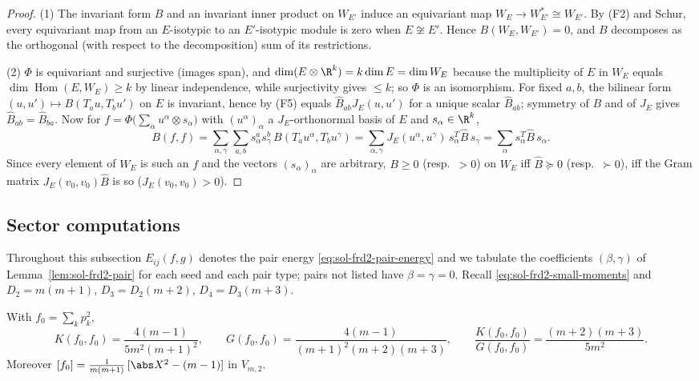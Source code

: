 \documentclass[../main.tex]{subfiles}
\begin{document}
\begin{proof}
(1)  The invariant form $B$ and an invariant inner product on $W_{E'}$ induce an
equivariant map $W_E\to W_{E'}^*\cong W_{E'}$.  By (F2) and Schur, every equivariant
map from an $E$-isotypic to an $E'$-isotypic module is zero when
$E\not\cong E'$.  Hence $B(W_E,W_{E'})=0$, and $B$ decomposes as the orthogonal
(with respect to the decomposition) sum of its restrictions.

(2)  $\Phi$ is equivariant and surjective (images span), and
$\dim(E\otimes\R^k)=k\dim E=\dim W_E$ because the multiplicity of $E$ in $W_E$
equals $\dim\operatorname{Hom}(E,W_E)\ge k$ by linear independence, while
surjectivity gives $\le k$; so $\Phi$ is an isomorphism.  For fixed $a,b$, the
bilinear form $(u,u')\mapsto B(T_au,T_bu')$ on $E$ is invariant, hence by (F5) equals
$\widehat B_{ab}J_E(u,u')$ for a unique scalar $\widehat B_{ab}$; symmetry of $B$ and
of $J_E$ gives $\widehat B_{ab}=\widehat B_{ba}$.  Now for
$f=\Phi\bigl(\sum_\alpha u^\alpha\otimes s_\alpha\bigr)$ with $(u^\alpha)_\alpha$ a
$J_E$-orthonormal basis of $E$ and $s_\alpha\in\R^k$,
\begin{equation}
  B(f,f)
  =\sum_{\alpha,\gamma}\sum_{a,b}
   s_\alpha^a s_\gamma^b\,B(T_au^\alpha,T_bu^\gamma)
  =\sum_{\alpha,\gamma}J_E(u^\alpha,u^\gamma)\,s_\alpha^T\widehat B\,s_\gamma
  =\sum_\alpha s_\alpha^T\widehat B\,s_\alpha.
  \label{eq:sol-frd2-tensor-sum}
\end{equation}
Since every element of $W_E$ is such an $f$ and the vectors
$(s_\alpha)_\alpha$ are arbitrary, $B\ge0$ (resp.\ $>0$) on $W_E$ iff
$\widehat B\succeq0$ (resp.\ $\succ0$), iff the Gram matrix
$J_E(v_0,v_0)\widehat B$ is so ($J_E(v_0,v_0)>0$).
\end{proof}

\subsection*{Sector computations}

Throughout this subsection $E_{ij}(f,g)$ denotes the pair energy
\eqref{eq:sol-frd2-pair-energy} and we tabulate the coefficients
$(\beta,\gamma)$ of Lemma~\ref{lem:sol-frd2-pair} for each seed and each pair type;
pairs not listed have $\beta=\gamma=0$.  Recall
\eqref{eq:sol-frd2-small-moments} and $D_2=m(m+1)$, $D_3=D_2(m+2)$,
$D_4=D_3(m+3)$.

\begin{lemma}
\label{lem:sol-frd2-trivial}
With $f_0=\sum_kp_k^2$,
\begin{equation}
  K(f_0,f_0)=\frac{4(m-1)}{5m^2(m+1)^2},
  \qquad
  G(f_0,f_0)=\frac{4(m-1)}{(m+1)^2(m+2)(m+3)},
  \qquad
  \frac{K(f_0,f_0)}{G(f_0,f_0)}=\frac{(m+2)(m+3)}{5m^2}.
  \label{eq:sol-frd2-trivial}
\end{equation}
Moreover $[f_0]=\tfrac1{m(m+1)}\,[\abs X^2-(m-1)]$ in $V_{m,2}$.
\end{lemma}
\end{document}
